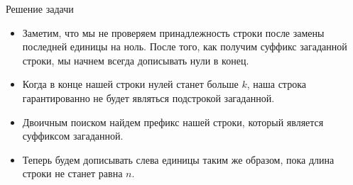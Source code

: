 \begin{frame}[t]{Решение задачи}
\begin{itemize}
    \item Заметим, что мы не проверяем принадлежность строки после замены последней единицы на ноль. После того, как получим суффикс загаданной строки, мы начнем всегда дописывать нули в конец.
    \item Когда в конце нашей строки нулей станет больше $k$, наша строка гарантированно не будет являться подстрокой загаданной.
    \item Двоичным поиском найдем префикс нашей строки, который является суффиксом загаданной.
    \item Теперь будем дописывать слева единицы таким же образом, пока длина строки не станет равна $n$.
\end{itemize}
\end{frame}
